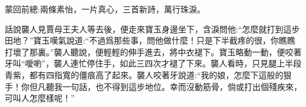 

\begin{parag}
    \begin{note}蒙回前總:兩條素怡，一片真心，三首新詩，萬行珠淚。\end{note}
\end{parag}


\begin{parag}
    話說襲人見賈母王夫人等去後，便走來寶玉身邊坐下，含淚問他:“怎麼就打到這步田地？”寶玉嘆氣說道:“不過爲那些事，問他做什麼！只是下半截疼的很，你瞧瞧打壞了那裏。”襲人聽說，便輕輕的伸手進去，將中衣褪下。寶玉略動一動，便咬著牙叫“噯喲”，襲人連忙停住手，如此三四次才褪了下來。襲人看時，只見腿上半段青紫，都有四指寬的僵痕高了起來。襲人咬著牙說道:“我的娘，怎麼下這般的狠手！你但凡聽我一句話，也不得到這步地位。幸而沒動筋骨，倘或打出個殘疾來，可叫人怎麼樣呢！”
\end{parag}


